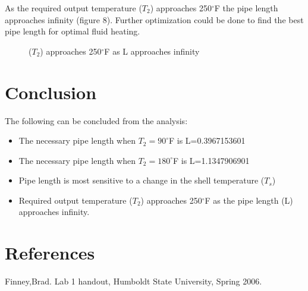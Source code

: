 \documentclass[titlepage,11pt]{article}
\begin{document}
As the required output temperature ($T_2$) approaches 250$^\circ$F
the pipe length approaches infinity (figure 8). Further optimization
could be done to find the best pipe length for optimal fluid
heating.\break\newpage
\begin{figure}[h] \label{PvsT}
  \begin{center}
    \caption{($T_2$) approaches 250$^\circ$F as L approaches infinity}
  \end{center}
\end{figure}
\section{Conclusion}
The following can be concluded from the analysis:
\begin{itemize}
\item{The necessary pipe length when $T_2=90^\circ$F is L=0.3967153601}
\item{The necessary pipe length when $T_2=180^\circ$F is L=1.1347906901}
\item{Pipe length is most sensitive to a change in the shell temperature ($T_s$)}
\item{Required output temperature ($T_2$) approaches 250$^\circ$F as
the pipe length (L) approaches infinity.}
\end{itemize}

\section{References}
\noindent Finney,Brad. Lab 1 handout, Humboldt State University,
Spring 2006.
\end{document}
